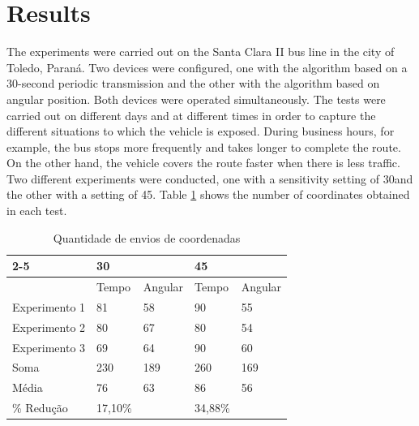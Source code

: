\section{Results} \label{sec:results}
The experiments were carried out on the Santa Clara II bus line in the city of Toledo, Paraná. Two devices were configured, one with the algorithm based on a 30-second periodic transmission and the other with the algorithm based on angular position. Both devices were operated simultaneously. The tests were carried out on different days and at different times in order to capture the different situations to which the vehicle is exposed. During business hours, for example, the bus stops more frequently and takes longer to complete the route. On the other hand, the vehicle covers the route faster when there is less traffic. Two different experiments were conducted, one with a sensitivity setting of 30\textdegree and the other with a setting of 45\textdegree. Table \ref{exp_envios} shows the number of coordinates obtained in each test.

\begin{table}[]
\begin{tabular}{l|ll|ll|}
\cline{2-5}
                                    & 30                         &         & 45                         &         \\ \hline
\multicolumn{1}{|l|}{}              & \multicolumn{1}{l|}{Tempo} & Angular & \multicolumn{1}{l|}{Tempo} & Angular \\ \hline
\multicolumn{1}{|l|}{Experimento 1} & \multicolumn{1}{l|}{81}    & 58      & \multicolumn{1}{l|}{90}    & 55      \\ \hline
\multicolumn{1}{|l|}{Experimento 2} & \multicolumn{1}{l|}{80}    & 67      & \multicolumn{1}{l|}{80}    & 54      \\ \hline
\multicolumn{1}{|l|}{Experimento 3} & \multicolumn{1}{l|}{69}    & 64      & \multicolumn{1}{l|}{90}    & 60      \\ \hline
\multicolumn{1}{|l|}{Soma}          & \multicolumn{1}{l|}{230}   & 189     & \multicolumn{1}{l|}{260}   & 169     \\ \hline
\multicolumn{1}{|l|}{Média}         & \multicolumn{1}{l|}{76}    & 63      & \multicolumn{1}{l|}{86}    & 56      \\ \hline
\multicolumn{1}{|l|}{\% Redução}    & 17,10\%                    &         & 34,88\%                    &         \\ \hline
\end{tabular}
\caption{Quantidade de envios de coordenadas}
\label{exp_envios}
\end{table}

